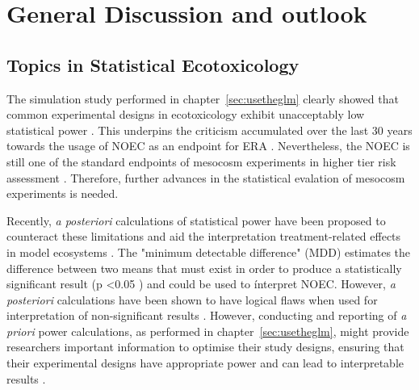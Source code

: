 
\chapter{General Discussion and outlook}
\label{sec:discussion} 
 
\section{Topics in Statistical Ecotoxicology}
The simulation study performed in chapter~\ref{sec:usetheglm} clearly showed that common experimental designs in ecotoxicology exhibit unacceptably low statistical power \citep{szocs_statistical_2016, van_der_hoeven_power_1998}.
This underpins the criticism accumulated over the last 30 years towards the usage of NOEC as an endpoint for ERA \citep{fox_comment_2016}. 
Nevertheless, the NOEC is still one of the standard endpoints of mesocosm experiments in higher tier risk assessment \citep{efsa_guidance_2013}.
Therefore, further advances in the statistical evalation of mesocosm experiments is needed.

Recently, \emph{a posteriori} calculations of statistical power have been proposed to counteract these limitations and aid the interpretation treatment-related effects in model ecosystems \citep{brock_minimum_2015}.
The "minimum detectable difference" (MDD) estimates the difference between two means that must exist in order to produce a statistically significant result (p \textless 0.05 \citep{gelman_difference_2006}) and could be used to ínterpret NOEC.
However, \emph{a posteriori} calculations have been shown to have logical flaws when used for interpretation of non-significant results \citep{hoenig_abuse_2001, nakagawa_case_2004}. 
However, conducting and reporting of \emph{a priori} power calculations, as performed in chapter~\ref{sec:usetheglm}, might provide researchers important information to optimise their study designs, ensuring that their experimental designs have appropriate power and can lead to interpretable results \citep{johnson_power_2015}.

